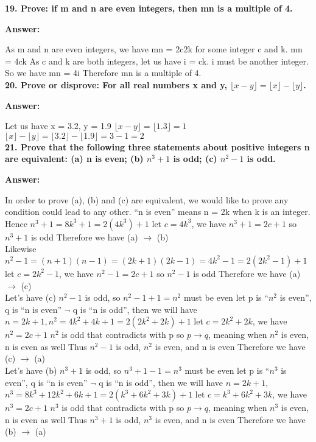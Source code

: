 \documentclass{article}
\begin{document}
\begin{large}
\textbf{19. Prove: if m and n are even integers, then mn is a multiple of 4.}

\textbf{Answer:}

As m and n are even integers, we have mn = 2c2k for some integer c and k.
mn = 4ck
As c and k are both integers, let us have i = ck. i must be another integer.
So we have mn = 4i
Therefore mn is a multiple of 4.\\

\textbf{20. Prove or disprove: For all real numbers x and y, $\lfloor x-y\rfloor =\lfloor x \rfloor -\lfloor y \rfloor$.}

\textbf{Answer:}

Let us have x = 3.2, y = 1.9
$\lfloor x-y\rfloor = \lfloor 1.3 \rfloor = 1$
$\lfloor x \rfloor - \lfloor y \rfloor = \lfloor 3.2 \rfloor - \lfloor 1.9 \rfloor = 3 - 1 = 2$\\

\textbf{21. Prove that the following three statements about positive integers n are equivalent: (a) n is even; (b) $n^3+1$ is odd; (c) $n^2-1$ is odd.}

\textbf{Answer:}


In order to prove (a), (b) and (c) are equivalent, we would like to prove any condition could lead to any other.
``n is even'' means n = 2k when k is an integer.
Hence $n^3 + 1 = 8k^3 + 1 = 2(4k^3) + 1$
let $c = 4k^3$, we have $n^3 + 1 = 2c + 1$
so $n^3 + 1$ is odd
Therefore we have (a) $\to$ (b)\\

Likewise $n^2-1 = (n+1)(n-1) = (2k+1)(2k-1) = 4k^2 - 1 = 2(2k^2-1) + 1$
let $c = 2k^2-1$, we have $n^2-1 = 2c + 1$
so $n^2-1$ is odd
Therefore we have (a) $\to$ (c)\\

Let's have (c) $n^2-1$ is odd, so $n^2 - 1 + 1 = n^2$ must be even
let p is ``$n^2$ is even'', q is ``n is even''
$\lnot$ q is ``n is odd'', then we will have $n = 2k+1, n^2 = 4k^2 + 4k + 1 = 2(2k^2 + 2k) + 1$
let $c = 2k^2 + 2k$, we have $n^2 = 2c + 1$
$n^2$ is odd that contradicts with p
so $p\to q$, meaning when $n^2$ is even, n is even as well
Thus $n^2-1$ is odd, $n^2$ is even, and n is even
Therefore we have (c) $\to$ (a)\\

Let's have (b) $n^3+1$ is odd, so $n^3 + 1 - 1 = n^3$ must be even
let p is ``$n^3$ is even'', q is ``n is even''
$\lnot$ q is ``n is odd'', then we will have $n = 2k+1$, $n^3 = 8k^3 + 12k^2 + 6k + 1 = 2(k^3 + 6k^2 + 3k) + 1$
let $c = k^3 + 6k^2 + 3k$, we have $n^3 = 2c + 1$
$n^3$ is odd that contradicts with p
so $p\to q$, meaning when $n^3$ is even, n is even as well
Thus $n^3+1$ is odd, $n^3$ is even, and n is even
Therefore we have (b) $\to$ (a)\\


\end{large}
\end{document}
